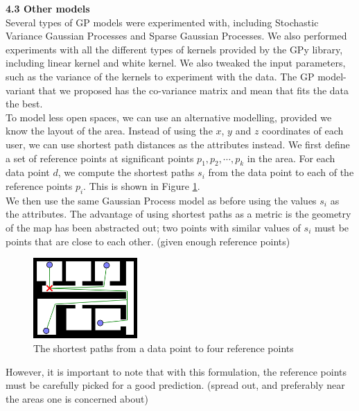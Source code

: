 \documentclass[letterpaper]{article}
\begin{document}
{\bf4.3  Other models} \\

Several types of GP models were experimented with, including Stochastic Variance Gaussian Processes and Sparse Gaussian Processes. We also performed experiments with all the different types of kernels provided by the GPy library, including linear kernel and white kernel. We also tweaked the input parameters, such as the variance of the kernels to experiment with the data. The GP model-variant that we proposed has the co-variance matrix and mean that fits the data the best. \\

To model less open spaces, we can use an alternative modelling, provided we know the layout of the area. Instead of using the $x$, $y$ and $z$ coordinates of each user, we can use shortest path distances as the attributes instead. We first define a set of reference points at significant points $p_1,p_2,\cdots,p_k$ in the area. For each data point $d$, we compute the shortest paths $s_i$ from the data point to each of the reference points $p_i$. This is shown in Figure \ref{fig:spaths}. \\

We then use the same Gaussian Process model as before using the values $s_i$ as the attributes. The advantage of using shortest paths as a metric is the geometry of the map has been abstracted out; two points with similar values of $s_i$ must be points that are close to each other. (given enough reference points)\\

\begin{figure}[h!]
  \centering
    \includegraphics[width=150px,natwidth=570,natheight=442]{shortestpaths.png}
  \caption{The shortest paths from a data point to four reference points}
  \label{fig:spaths}
\end{figure}

However, it is important to note that with this formulation, the reference points must be carefully picked for a good prediction. (spread out, and preferably near the areas one is concerned about) \\
\end{document}
